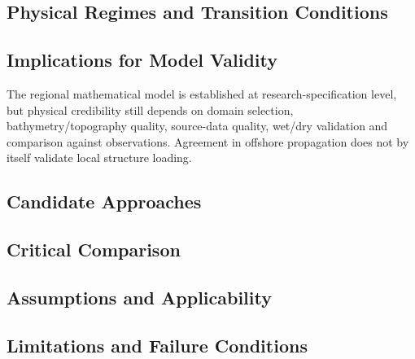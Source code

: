 
\subsection{Physical Regimes and Transition Conditions}
\label{sec:res-phy-syn-physical-regimes-transition-conditions}


\subsection{Implications for Model Validity}
\label{sec:res-phy-syn-model-validity-implications}

The regional mathematical model is established at research-specification
level, but physical credibility still depends on domain selection,
bathymetry/topography quality, source-data quality, wet/dry validation
and comparison against observations. Agreement in offshore propagation
does not by itself validate local structure loading.

\subsection{Candidate Approaches}
\label{sec:res-phy-syn-candidate-approaches}


\subsection{Critical Comparison}
\label{sec:res-phy-syn-critical-comparison}


\subsection{Assumptions and Applicability}
\label{sec:res-phy-syn-assumptions}


\subsection{Limitations and Failure Conditions}
\label{sec:res-phy-syn-limitations}

